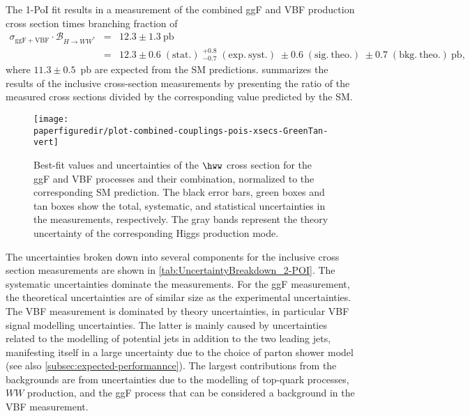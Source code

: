 The 1-PoI fit results in a measurement of the combined ggF and VBF production cross section times branching fraction of
\begin{eqnarray*}
  \sigma_{\mathrm{ggF+VBF}} \cdot \mathcal{B}_{H \to WW^{\ast}} &=& 12.3 \pm 1.3~\mathrm{pb} \\
  &=& 12.3 \pm 0.6\;(\mathrm{stat.})\;^{+0.8}_{-0.7}\;(\mathrm{exp.\ syst.})\;\pm 0.6\;(\mathrm{sig.\ theo.})\;\pm 0.7\;(\mathrm{bkg.\ theo.})~\mathrm{pb},
\end{eqnarray*}
where $11.3\pm 0.5$~pb are expected from the SM predictions.
 summarizes the results of the inclusive cross-section measurements by presenting the ratio of the measured cross sections divided by the corresponding value predicted by the SM.
\begin{figure}[htb]
  \centering
    \texttt{[image: \\paperfiguredir/plot-combined-couplings-pois-xsecs-GreenTan-vert]}
    \caption{
      Best-fit values and uncertainties of the $\hww$ cross section for the ggF and VBF processes and their combination, normalized to the corresponding SM prediction.
      The black error bars, green boxes and tan boxes show the total, systematic, and statistical uncertainties in the measurements, respectively.
      The gray bands represent the theory uncertainty of the corresponding Higgs production mode.
      \label{fig:couplings-POIs}
    }
\end{figure}
The uncertainties broken down into several components for the inclusive cross section measurements are shown in \cref{tab:UncertaintyBreakdown_2-POI}. 
The systematic uncertainties dominate the measurements. 
For the ggF measurement, the theoretical uncertainties are of similar size as the experimental uncertainties.
The VBF measurement is dominated by theory uncertainties, in particular VBF signal modelling uncertainties.
The latter is mainly caused by uncertainties related to the modelling of potential jets in addition to the two leading jets, manifesting itself in a large uncertainty due to the choice of parton shower model (see also \cref{subsec:expected-performannce}). The largest contributions from the backgrounds are from uncertainties due to the modelling of top-quark processes, $WW$ production, and the ggF process that can be considered a background in the VBF measurement. 

